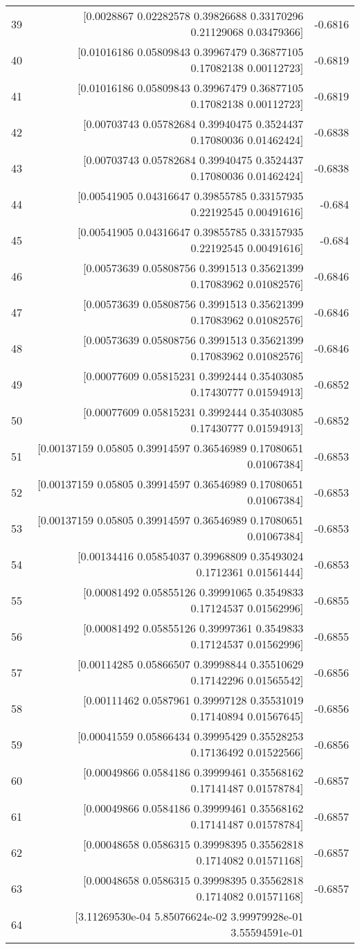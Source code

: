 \begin{longtable}{lrr}
39 & [0.0028867  0.02282578 0.39826688 0.33170296 0.21129068 0.03479366] & -0.6816 \\
40 & [0.01016186 0.05809843 0.39967479 0.36877105 0.17082138 0.00112723] & -0.6819 \\
41 & [0.01016186 0.05809843 0.39967479 0.36877105 0.17082138 0.00112723] & -0.6819 \\
42 & [0.00703743 0.05782684 0.39940475 0.3524437  0.17080036 0.01462424] & -0.6838 \\
43 & [0.00703743 0.05782684 0.39940475 0.3524437  0.17080036 0.01462424] & -0.6838 \\
44 & [0.00541905 0.04316647 0.39855785 0.33157935 0.22192545 0.00491616] & -0.684 \\
45 & [0.00541905 0.04316647 0.39855785 0.33157935 0.22192545 0.00491616] & -0.684 \\
46 & [0.00573639 0.05808756 0.3991513  0.35621399 0.17083962 0.01082576] & -0.6846 \\
47 & [0.00573639 0.05808756 0.3991513  0.35621399 0.17083962 0.01082576] & -0.6846 \\
48 & [0.00573639 0.05808756 0.3991513  0.35621399 0.17083962 0.01082576] & -0.6846 \\
49 & [0.00077609 0.05815231 0.3992444  0.35403085 0.17430777 0.01594913] & -0.6852 \\
50 & [0.00077609 0.05815231 0.3992444  0.35403085 0.17430777 0.01594913] & -0.6852 \\
51 & [0.00137159 0.05805    0.39914597 0.36546989 0.17080651 0.01067384] & -0.6853 \\
52 & [0.00137159 0.05805    0.39914597 0.36546989 0.17080651 0.01067384] & -0.6853 \\
53 & [0.00137159 0.05805    0.39914597 0.36546989 0.17080651 0.01067384] & -0.6853 \\
54 & [0.00134416 0.05854037 0.39968809 0.35493024 0.1712361  0.01561444] & -0.6853 \\
55 & [0.00081492 0.05855126 0.39991065 0.3549833  0.17124537 0.01562996] & -0.6855 \\
56 & [0.00081492 0.05855126 0.39997361 0.3549833  0.17124537 0.01562996] & -0.6855 \\
57 & [0.00114285 0.05866507 0.39998844 0.35510629 0.17142296 0.01565542] & -0.6856 \\
58 & [0.00111462 0.0587961  0.39997128 0.35531019 0.17140894 0.01567645] & -0.6856 \\
59 & [0.00041559 0.05866434 0.39995429 0.35528253 0.17136492 0.01522566] & -0.6856 \\
60 & [0.00049866 0.0584186  0.39999461 0.35568162 0.17141487 0.01578784] & -0.6857 \\
61 & [0.00049866 0.0584186  0.39999461 0.35568162 0.17141487 0.01578784] & -0.6857 \\
62 & [0.00048658 0.0586315  0.39998395 0.35562818 0.1714082  0.01571168] & -0.6857 \\
63 & [0.00048658 0.0586315  0.39998395 0.35562818 0.1714082  0.01571168] & -0.6857 \\
64 & [3.11269530e-04 5.85076624e-02 3.99979928e-01 3.55594591e-01


\end{longtable}
